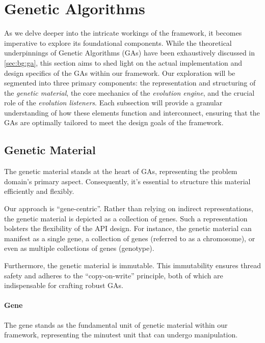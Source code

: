 \section{Genetic Algorithms}
\label{sec:genetic_algorithms}
  As we delve deeper into the intricate workings of the framework, it becomes 
  imperative to explore its foundational components.
  While the theoretical underpinnings of Genetic Algorithms (GAs) have been 
  exhaustively discussed in \vref{sec:bg:ga}, this section aims to shed light 
  on the actual implementation and design specifics of the GAs within our 
  framework.
  Our exploration will be segmented into three primary components: the 
  representation and structuring of the \emph{genetic material}, the core 
  mechanics of the \emph{evolution engine}, and the crucial role of the 
  \emph{evolution listeners}.
  Each subsection will provide a granular understanding of how these elements 
  function and interconnect, ensuring that the GAs are optimally tailored to 
  meet the design goals of the framework.
  
  \subsection{Genetic Material}
  \label{sec:keen:ga:material}
    The genetic material stands at the heart of GAs, representing the problem 
    domain's primary aspect.
    Consequently, it's essential to structure this material efficiently and 
    flexibly.

    Our approach is \enquote{gene-centric}.
    Rather than relying on indirect representations, the genetic material is 
    depicted as a collection of genes.
    Such a representation bolsters the flexibility of the API design.
    For instance, the genetic material can manifest as a single gene, a 
    collection of genes (referred to as a chromosome), or even as multiple 
    collections of genes (genotype).

    Furthermore, the genetic material is immutable.
    This immutability ensures thread safety and adheres to the 
    \enquote{copy-on-write} principle, both of which are indispensable for 
    crafting robust GAs.

    \paragraph{Gene}
      The gene stands as the fundamental unit of genetic material within our 
      framework, representing the minutest unit that can undergo manipulation.

